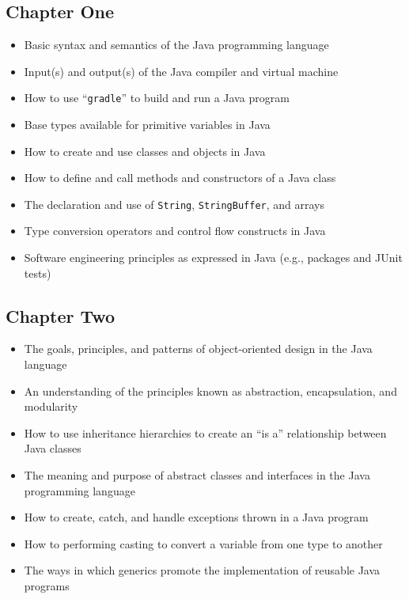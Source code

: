 \documentclass[11pt]{article}
\newcommand{\command}[1]{``\lstinline{#1}''}
\newcommand{\program}[1]{\lstinline{#1}}
\begin{document}
\subsection*{Chapter One}

\begin{itemize}

  \itemsep 0in

  \item Basic syntax and semantics of the Java programming language
  \item Input(s) and output(s) of the Java compiler and virtual machine
  \item How to use \command{gradle} to build and run a Java program
  \item Base types available for primitive variables in Java
  \item How to create and use classes and objects in Java
  \item How to define and call methods and constructors of a Java class
  \item The declaration and use of \program{String}, \program{StringBuffer}, and arrays
  \item Type conversion operators and control flow constructs in Java
  \item Software engineering principles as expressed in Java (e.g., packages and
    JUnit tests)

\end{itemize}

\vspace*{-.2in}
\subsection*{Chapter Two}

\begin{itemize}

  \itemsep 0in

  \item The goals, principles, and patterns of object-oriented design in the
    Java language
  \item An understanding of the principles known as abstraction, encapsulation, and modularity
  \item How to use inheritance hierarchies to create an ``is a'' relationship
    between Java classes
  \item The meaning and purpose of abstract classes and interfaces in the Java
    programming language
  \item How to create, catch, and handle exceptions thrown in a Java program
  \item How to performing casting to convert a variable from one type to another
  \item The ways in which generics promote the implementation of reusable Java
    programs

\end{itemize}
\end{document}
